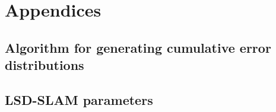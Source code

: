 \chapter{Appendices}


\section{Algorithm for generating cumulative error distributions}


\newpage


\newpage


\section{LSD-SLAM parameters}
\label{sec:slampars}


